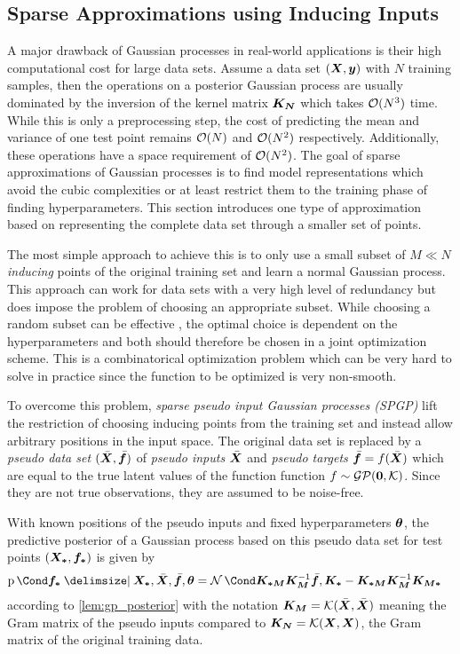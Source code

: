 \subsection{Sparse Approximations using Inducing Inputs}
A major drawback of Gaussian processes in real-world applications is their high computational cost for large data sets.
Assume a data set $(\bm{X}, \bm{y})$ with $N$ training samples, then the operations on a posterior Gaussian process are usually dominated by the inversion of the kernel matrix $\bm{K_N}$ which takes $\operatorname{\mathcal{O}}(N^3)$ time.
While this is only a preprocessing step, the cost of predicting the mean and variance of one test point remains $\operatorname{\mathcal{O}}(N)$ and $\operatorname{\mathcal{O}}(N^2)$ respectively.
Additionally, these operations have a space requirement of $\operatorname{\mathcal{O}}(N^2)$.
The goal of sparse approximations of Gaussian processes is to find model representations which avoid the cubic complexities or at least restrict them to the training phase of finding hyperparameters.
This section introduces one type of approximation based on representing the complete data set through a smaller set of points.

The most simple approach to achieve this is to only use a small subset of $M \ll N$ \emph{inducing} points of the original training set and learn a normal Gaussian process.
This approach can work for data sets with a very high level of redundancy but does impose the problem of choosing an appropriate subset.
While choosing a random subset can be effective \cite{snelson_flexible_2007}, the optimal choice is dependent on the hyperparameters and both should therefore be chosen in a joint optimization scheme.
This is a combinatorical optimization problem which can be very hard to solve in practice since the function to be optimized is very non-smooth.

To overcome this problem, \emph{sparse pseudo input Gaussian processes (SPGP)} \cite{snelson_flexible_2007} lift the restriction of choosing inducing points from the training set and instead allow arbitrary positions in the input space.
The original data set is replaced by a \emph{pseudo data set} $(\bar{\bm{X}}, \bar{\bm{f}})$ of \emph{pseudo inputs} $\bar{\bm{X}}$ and \emph{pseudo targets} $\bar{\bm{f}} = f(\bar{\bm{X}})$ which are equal to the true latent values of the function function $f \sim \operatorname{\mathcal{GP}}(\bm{0}, \operatorname{\mathcal{K}})$.
Since they are not true observations, they are assumed to be noise-free.

With known positions of the pseudo inputs and fixed hyperparameters $\bm{\theta}$, the predictive posterior of a Gaussian process based on this pseudo data set for test points $(\bm{X_\ast}, \bm{f_\ast})$ is given by
\begin{align}
    \Prob{\mat{f_\ast} \given \mat{X_\ast}, \ps{\mat{X}}, \ps{\mat{f}}, \mat{\theta}} &= \Gaussian{\mat{K_{\ast M}}\mat{K_M}^{-1} \ps{\mat{f}}, \mat{K_\ast} - \mat{K_{\ast M}} \mat{K_M}^{-1} \mat{K_{M \ast}}}
\end{align}
according to \cref{lem:gp_posterior} with the notation $\bm{K_M} = \operatorname{\mathcal{K}}(\bar{\bm{X}}, \bar{\bm{X}})$ meaning the Gram matrix of the pseudo inputs compared to $\bm{K_N} = \operatorname{\mathcal{K}}(\bm{X}, \bm{X})$, the Gram matrix of the original training data.

